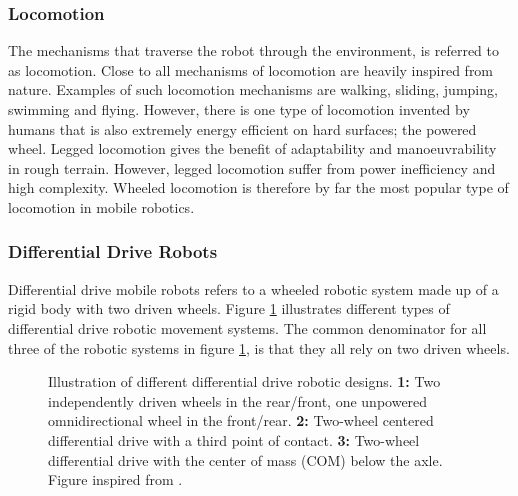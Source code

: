 \subsubsection{Locomotion}
The mechanisms that traverse the robot through the environment, is referred to as locomotion. Close to all mechanisms of locomotion are heavily inspired from nature. Examples of such locomotion mechanisms are walking, sliding, jumping, swimming and flying. However, there is one type of locomotion invented by humans that is also extremely energy efficient on hard surfaces; the powered wheel. Legged locomotion gives the benefit of adaptability and manoeuvrability in rough terrain. However, legged locomotion suffer from power inefficiency and high complexity. Wheeled locomotion is therefore by far the most popular type of locomotion in mobile robotics\cite{SiegwartRoland2011Itam}.

\subsubsection{Differential Drive Robots}\label{sec:T:AN:MRD:DifferentialDriveRobots}
Differential drive mobile robots refers to a wheeled robotic system made up of a rigid body with two driven wheels. Figure \ref{fig:differentialDrive} illustrates different types of differential drive robotic movement systems. The common denominator for all three of the robotic systems in figure \ref{fig:differentialDrive}, is that they all rely on two driven wheels.

\begin{figure}[htp]
  \centering
  
  \caption{Illustration of different differential drive robotic designs. \textbf{1:} Two independently driven wheels in the rear/front, one unpowered omnidirectional wheel in the front/rear. \textbf{2:} Two-wheel centered differential drive with a third point of contact. \textbf{3:} Two-wheel differential drive with the center of mass (COM) below the axle. Figure inspired from \cite{SiegwartRoland2011Itam}.}
  \label{fig:differentialDrive}
\end{figure}


